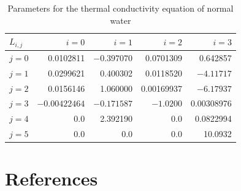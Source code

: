 \documentclass[11pt]{article}
\begin{document}
\begin{table}[htbp]
\centering
\caption{Parameters for the thermal conductivity equation of normal water}
\begin{tabular}{lrrrr}
\toprule
$L_{i,j}$ & $i=0$ & $i=1$ & $i=2$ & $i=3$ \\
\midrule
$j=0$ & 0.0102811 & $-0.397070$ & 0.0701309 & 0.642857 \\
$j=1$ & 0.0299621 & 0.400302 & 0.0118520 & $-4.11717$ \\
$j=2$ & 0.0156146 & 1.060000 & 0.00169937 & $-6.17937$ \\
$j=3$ & $-0.00422464$ & $-0.171587$ & $-1.0200$ & 0.00308976 \\
$j=4$ & 0.0 & 2.392190 & 0.0 & 0.0822994 \\
$j=5$ & 0.0 & 0.0 & 0.0 & 10.0932 \\
\bottomrule
\end{tabular}
\end{table}

\section*{References}
\end{document}
